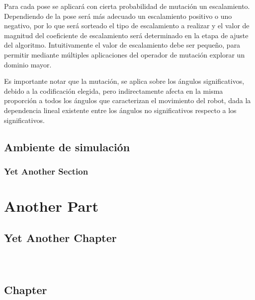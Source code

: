 \documentclass[
  twoside,
  11pt, a4paper,
  footinclude=true,
  headinclude=true,
  cleardoublepage=empty
]{scrbook}
\begin{document}
Para cada pose se aplicará con cierta probabilidad de mutación un escalamiento. Dependiendo de la pose será más adecuado un escalamiento positivo o uno negativo, por lo que será sorteado el tipo de escalamiento a realizar y el valor de magnitud del coeficiente de escalamiento será determinado en la etapa de ajuste del algoritmo. Intuitivamente el valor de escalamiento debe ser pequeño, para permitir mediante múltiples aplicaciones del operador de mutación explorar un dominio mayor.

Es importante notar que la mutación, se aplica sobre los ángulos significativos, debido a la codificación elegida, pero indirectamente afecta en la misma proporción a todos los ángulos que caracterizan el movimiento del robot, dada la dependencia lineal existente entre los ángulos no significativos respecto a los significativos. 

\chapter{Ambiente de simulación}
\lipsum[1] %

\section{Yet Another Section}
\lipsum[1] %

\part{Another Part}

\chapter{Yet Another Chapter}
\lipsum[1] %


  
\
\part{}
\chapter{ Chapter}
\lipsum[1]


\end{document}

